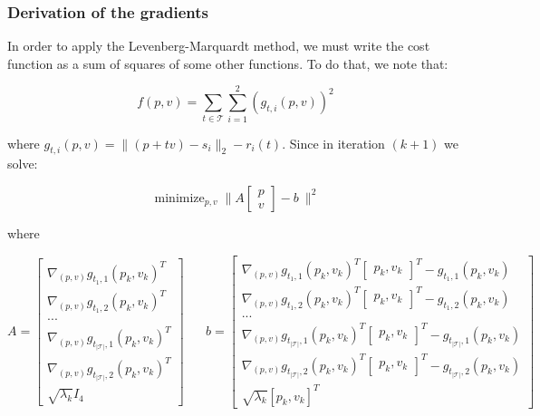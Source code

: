 \documentclass[12pt]{article}
\DeclareMathOperator*{\minimize}{minimize}
\begin{document}
\subsubsection*{Derivation of the gradients}

In order to apply the Levenberg-Marquardt method, we must write the cost function as a sum of squares of some other functions. To do that, we note that:

\[
    f(p, v) = \sum_{t \in \mathcal{T}} \sum_{i = 1}^2 (g_{t, i}(p, v))^2
\]

where $g_{t, i}(p, v) = \|(p + tv) - s_i \|_2 - r_i(t)$. Since in iteration $(k + 1)$ we solve:

\[
    \minimize_{p, v} \bigg\|A \begin{bmatrix} p \\ v\end{bmatrix} - b \: \bigg\| ^ 2
\]

where

\[
    A = \begin{bmatrix}
        \nabla_{(p, v)}g_{t_1, 1}(p_k, v_k)^T \\
        \nabla_{(p, v)}g_{t_1, 2}(p_k, v_k)^T \\
        ... \\
        \nabla_{(p, v)}g_{t_{|\mathcal{T}|}, 1}(p_k, v_k)^T \\
        \nabla_{(p, v)}g_{t_{|\mathcal{T}|}, 2}(p_k, v_k)^T \\
        \sqrt{\lambda_k} I_4
    \end{bmatrix} \; \; \; \; \; \; 
    b = \begin{bmatrix}
        \nabla_{(p, v)}g_{t_1, 1}(p_k, v_k)^T 
        \begin{bmatrix} p_k, v_k \end{bmatrix}^T - g_{t_1, 1}(p_k, v_k)\\
        \nabla_{(p, v)}g_{t_1, 2}(p_k, v_k)^T 
        \begin{bmatrix} p_k, v_k \end{bmatrix}^T - g_{t_1, 2}(p_k, v_k) \\
        ... \\
        \nabla_{(p, v)}g_{t_{|\mathcal{T}|}, 1}(p_k, v_k)^T 
        \begin{bmatrix} p_k, v_k \end{bmatrix}^T - g_{t_{|\mathcal{T}|}, 1}(p_k, v_k) \\
        \nabla_{(p, v)}g_{t_{|\mathcal{T}|}, 2}(p_k, v_k)^T 
        \begin{bmatrix} p_k, v_k \end{bmatrix}^T - g_{t_{|\mathcal{T}|}, 2}(p_k, v_k) \\
        \sqrt{\lambda_k} [p_k, v_k]^T 
    \end{bmatrix} \; \; \; \; \; \; 
\]
\end{document}
